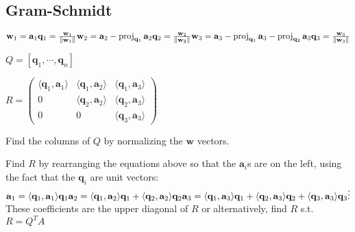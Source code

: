 \documentclass[10pt,letterpaper]{article}
\newenvironment{tight_enum}
{\begin{enumerate}
\setlength{\parskip}{0pt}
\setlength{\parsep}{0pt}
\setlength{\itemsep}{0pt}
\setlength{\parsep}{0pt}
\setlength{\topsep}{0pt}
\setlength{\partopsep}{0pt}
\setlength{\leftmargin}{0em}
\setlength{\labelwidth}{0em}
\setlength{\labelsep}{0em} }
{\end{enumerate}}
\begin{document}
{\begin{multicols*}{5}
\subsection{Gram-Schmidt}
$ \mathbf{w}_1 = \mathbf{a}_1 \\ 
   \mathbf{q}_1 = {\mathbf{w}_1 \over \|\mathbf{w}_1\|} \\
 \mathbf{w}_2 = \mathbf{a}_2-\mathrm{proj}_{\mathbf{q}_1}\,\mathbf{a}_2 \\
   \mathbf{q}_2 = {\mathbf{w}_2 \over \|\mathbf{w}_2\|} \\
 \mathbf{w}_3 = \mathbf{a}_3-\mathrm{proj}_{\mathbf{q}_1}\,\mathbf{a}_3-\mathrm{proj}_{\mathbf{q}_2}\,\mathbf{a}_3 \\
   \mathbf{q}_3 = {\mathbf{w}_3 \over \|\mathbf{w}_3\|} \\
$
\begin{center}
$Q = \left[ \mathbf{q}_1, \cdots, \mathbf{q}_n\right] \qquad$
\end{center}
$R = \begin{pmatrix} 
\langle\mathbf{q}_1,\mathbf{a}_1\rangle & \langle\mathbf{q}_1,\mathbf{a}_2\rangle &  \langle\mathbf{q}_1,\mathbf{a}_3\rangle\\
0                & \langle\mathbf{q}_2,\mathbf{a}_2\rangle                        &  \langle\mathbf{q}_2,\mathbf{a}_3\rangle\\
0                & 0                                       & \langle\mathbf{q}_3,\mathbf{a}_3\rangle                        \end{pmatrix}$
\begin{tight_enum}
\item Find the columns of $Q$ by normalizing the $\textbf{w}$ vectors.
\item Find $R$ by rearranging the equations above so that the $\mathbf{a}_i$s are on the left, using the fact that the $\mathbf{q}_i$ are unit vectors:\\
$
 \mathbf{a}_1 = \langle\mathbf{q}_1,\mathbf{a}_1 \rangle \mathbf{q}_1  \\
 \mathbf{a}_2 = \langle\mathbf{q}_1,\mathbf{a}_2 \rangle \mathbf{q}_1 
  + \langle\mathbf{q}_2,\mathbf{a}_2 \rangle \mathbf{q}_2 \\
 \mathbf{a}_3 = \langle\mathbf{q}_1,\mathbf{a}_3 \rangle \mathbf{q}_1 
  + \langle\mathbf{q}_2,\mathbf{a}_3 \rangle \mathbf{q}_2 
  + \langle\mathbf{q}_3,\mathbf{a}_3 \rangle \mathbf{q}_3 \\
 \vdots $ \\
These coefficients are the upper diagonal of $R$ or alternatively, find $R$ s.t. $R =Q^{T}A$
\end{tight_enum}

\end{multicols*}}
\end{document}
